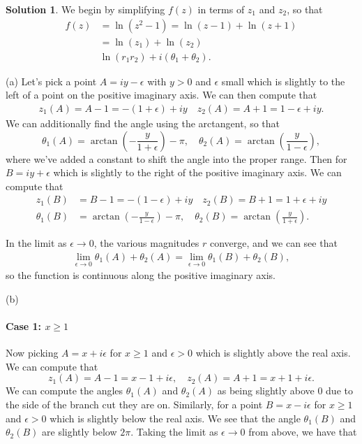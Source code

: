 \documentclass[12pt]{article}
\theoremstyle{definition}
\newtheorem{sol}{Solution}
\theoremstyle{remark}
\begin{document}
\begin{sol}
    We begin by simplifying $f(z)$ in terms of $z_1$ and $z_2$, so that
    \begin{align*}
        f(z) &= \ln(z^2  -1) = \ln(z-1) + \ln(z+1)\\
             &= \ln(z_1) + \ln(z_2)\\
             & \ln(r_{1}r_{2}) + i(\theta_{1} + \theta_{2}).
    \end{align*}

    (a) Let's pick a point $A=iy-\epsilon$ with $y>0$ and $\epsilon$ small which is slightly to the left of a point on the positive imaginary axis.  We can then compute that
    \begin{align*}
        z_1(A) = A - 1 = -(1+\epsilon) + iy \quad z_{2}(A) = A + 1 = 1-\epsilon + iy.
    \end{align*}
    We can additionally find the angle using the arctangent, so that 
    \begin{equation}
        \theta_{1}(A) = \arctan(- \frac{y}{1+\epsilon} ) - \pi, \quad  \theta_{2}(A) = \arctan( \frac{y}{1-\epsilon} ),
    \end{equation}
    where we've added a constant to shift the angle into the proper range.
    Then for $B = iy + \epsilon$ which is slightly to the right of the positive imaginary axis. We can compute that
    \begin{align*}
        z_1(B) &= B - 1 = -(1-\epsilon) + iy \quad z_{2}(B) = B + 1 = 1+\epsilon + iy\\
        \theta_{1}(B) &= \arctan( -\frac{y}{1-\epsilon} ) - \pi, \quad  \theta_{2}(B) = \arctan( \frac{y}{1+\epsilon} ).
    \end{align*}

    In the limit as $\epsilon \to 0$, the various magnitudes $r$ converge, and we can see that 
    \begin{align*}
        \lim_{\epsilon\to 0}  \theta_{1}(A) + \theta_{2}(A) = \lim_{\epsilon \to 0} \theta_{1}(B) + \theta_{2}(B),
    \end{align*}
    so the function is continuous along the positive imaginary axis.

    \newpage

    (b) 
\paragraph{Case 1: $x\geq1$}%

    Now picking $A = x + i\epsilon$ for $x\geq 1$ and $\epsilon>0$ which is slightly above the real axis. We can compute that 
    \begin{equation*}
        z_1(A) = A - 1 = x - 1 + i\epsilon, \quad z_2(A) = A + 1 = x + 1 + i \epsilon.
    \end{equation*}
    We can compute the angles $\theta_{1}(A)$ and $\theta_{2}(A) $ as being slightly above 0 due to the side of the branch cut they are on. Similarly, for a point $B = x - i \epsilon$ for $x\geq1$ and $\epsilon>0$ which is slightly below the real axis. We see that the angle $\theta_{1}(B)$ and $\theta_{2}(B) $ are slightly below $2\pi$.   Taking the limit as $\epsilon\to 0$ from above, we have that 


\end{sol}
\end{document}
